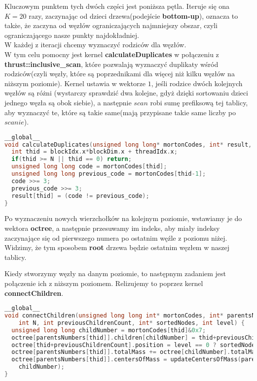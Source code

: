 \documentclass[14pt,twoside,a4paper]{article}
\theoremstyle{definition}
\begin{document}
Kluczowym punktem tych dwóch części jest poniższa pętla. Iteruje się ona $K=20$ razy, zaczynając od dzieci drzewa(podejście \textbf{bottom-up}), oznacza to także, że zaczyna od węzłów ograniczających najmniejszy obszar, czyli ograniczającego nasze punkty najdokładniej.\\
W każdej z iteracji chcemy wyznaczyć rodziców dla węzłów. \\W tym celu pomocny jest kernel \textbf{calculateDuplicates} w połączeniu z \textbf{thrust::inclusive\_scan}, które pozwalają wyznaczyć duplikaty wśród rodziców(czyli węzły, które są poprzednikami dla więcej niż kilku węzłów na niższym poziomie). 
Kernel ustawia w wektorze $1$, jeśli rodzice dwóch kolejnych węzłów są różni (wystarczy sprawdzić dwa kolejne, gdyż dzięki sortowaniu dzieci jednego węzła są obok siebie), a następnie $scan$ robi sumę prefiksową tej tablicy, aby wyznaczyć te, które są takie same(mają przypisane takie same liczby po $scanie$).

\begin{lstlisting}[language=C++, frame=single, framerule=2pt, caption=Kernel calculateDuplicates]
__global__
void calculateDuplicates(unsigned long long* mortonCodes, int* result, int N) {
  int thid = blockIdx.x*blockDim.x + threadIdx.x;
  if(thid >= N || thid == 0) return;
  unsigned long long code = mortonCodes[thid];
  unsigned long long previous_code = mortonCodes[thid-1];
  code >>= 3;
  previous_code >>= 3;
  result[thid] = (code != previous_code);
}

\end{lstlisting}
\bigskip
Po wyznaczeniu nowych wierzchołków na kolejnym poziomie, wstawiamy je do wektora \textbf{octree}, a następnie przesuwamy im indeks, aby miały indeksy zaczynające się od pierwszego numera po ostatnim węźle z poziomu niżej. Widzimy, że tym sposobem \textbf{root} drzewa będzie ostatnim węzłem w naszej tablicy.

Kiedy stworzymy węzły na danym poziomie, to następnym zadaniem jest połączenie ich z niższym poziomem. Relizujemy to poprzez kernel \textbf{connectChildren}.
\begin{lstlisting}[language=C++, frame=single, framerule=2pt, caption=Kernel connectChildren]
__global__
void connectChildren(unsigned long long int* mortonCodes, int* parentsNumbers, OctreeNode* octree, 
    int N, int previousChildrenCount, int* sortedNodes, int level) {
  unsigned long long childNumber = mortonCodes[thid]&0x7;
  octree[parentsNumbers[thid]].children[childNumber] = thid+previousChildrenCount;
  octree[thid+previousChildrenCount].position = level == 0 ? sortedNodes[thid] : -1;
  octree[parentsNumbers[thid]].totalMass += octree[childNumber].totalMass;
  octree[parentsNumbers[thid]].centersOfMass = updateCentersOfMass(parentsNumbers[thid], 
  	childNumber);
}
\end{lstlisting}
\end{document}
